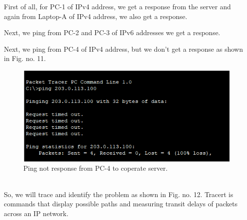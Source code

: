 \documentclass[12pt,a4paper]{article}
\begin{document}
First of all, for PC-1 of IPv4 address, we get a response from the server and again from Laptop-A of IPv4 address, we also get a response.

Next, we ping from PC-2 and PC-3 of IPv6 addresses we get a response.

Next, we ping from PC-4 of IPv4 address, but we don't get a response as shown in Fig. no. 11. \\
\begin{figure}[h]
 		\centering
				\includegraphics[scale=0.75]{5.2.png}	


			\caption{Ping not response from PC-4 to coperate server.}
			\label{fig:AP}
	\end{figure}
\pagebreak \\
So, we will trace and identify the problem as shown in Fig. no. 12. Tracert is commands that display possible paths and measuring transit delays of packets across an IP network.
\end{document}
